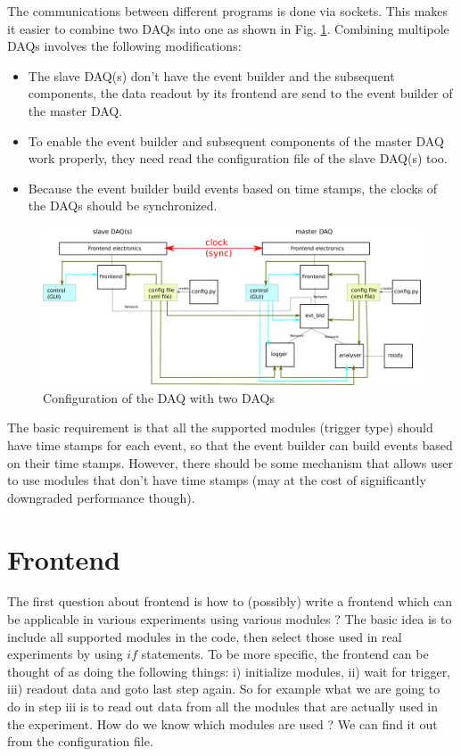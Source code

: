 \documentclass[a4paper,12pt]{article}
\begin{document}
	The communications between different programs is done via sockets. This
	makes it easier to combine two DAQs into one as shown in Fig.
	\ref{fig02}. Combining multipole DAQs involves the following
	modifications:
	\begin{itemize}
		\item The slave DAQ(s) don't have the event builder and the
			subsequent components, the data readout by its frontend are send
			to the event builder of the master DAQ.
		\item To enable the event builder and subsequent components of the
			master DAQ work properly, they need read the configuration file
			of the slave DAQ(s) too.
		\item Because the event builder build events based on time stamps,
			the clocks of the DAQs should be synchronized.
	\end{itemize}
	\begin{figure}
		\begin{center}
			\includegraphics[width=.9\textwidth]{figs/daq_scheme2.eps}
			\caption{\label{fig02}Configuration of the DAQ with two DAQs}
		\end{center}
	\end{figure}
	The basic requirement is that all the supported modules (trigger type)
	should have time stamps for each event, so that the event builder can
	build events based on their time stamps. However, there should be some
	mechanism that allows user to use modules that don't have time stamps
	(may at the cost of significantly downgraded performance though).


	\section{Frontend}
	The first question about frontend is how to (possibly) write a frontend
	which can be applicable in various experiments using various modules ?
	The basic idea is to include all supported modules in the code, then
	select those used in real experiments by using $if$ statements. To be
	more specific, the frontend can be thought of as doing the following
	things: i) initialize modules, ii) wait for trigger, iii) readout data
	and goto last step again. So for example what we are going to do in step
	iii is to read out data from all the modules that are actually used in
	the experiment. How do we know which modules are used ? We can find it
	out from the configuration file.
\end{document}
